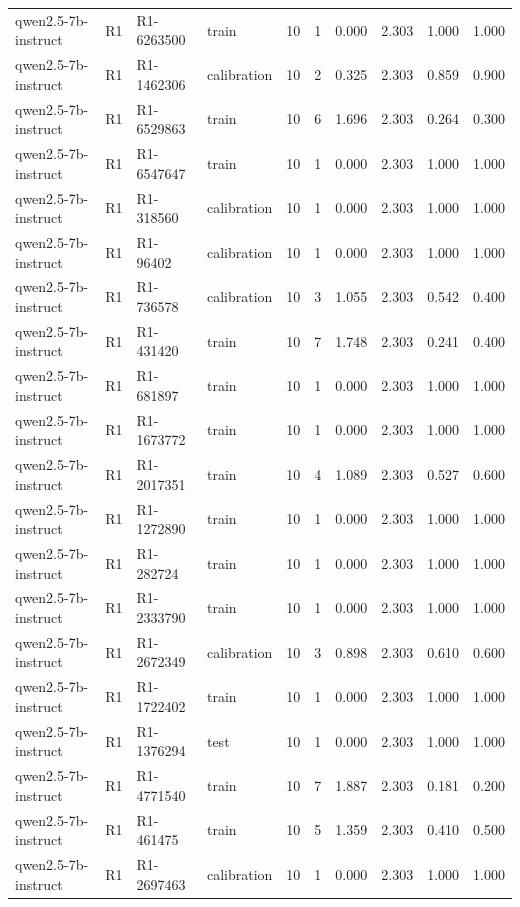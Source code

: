 \begin{table}
\begin{tabular}{llllrrrrrr}
qwen2.5-7b-instruct & R1 & R1-6263500 & train & 10 & 1 & 0.000 & 2.303 & 1.000 & 1.000 \\
qwen2.5-7b-instruct & R1 & R1-1462306 & calibration & 10 & 2 & 0.325 & 2.303 & 0.859 & 0.900 \\
qwen2.5-7b-instruct & R1 & R1-6529863 & train & 10 & 6 & 1.696 & 2.303 & 0.264 & 0.300 \\
qwen2.5-7b-instruct & R1 & R1-6547647 & train & 10 & 1 & 0.000 & 2.303 & 1.000 & 1.000 \\
qwen2.5-7b-instruct & R1 & R1-318560 & calibration & 10 & 1 & 0.000 & 2.303 & 1.000 & 1.000 \\
qwen2.5-7b-instruct & R1 & R1-96402 & calibration & 10 & 1 & 0.000 & 2.303 & 1.000 & 1.000 \\
qwen2.5-7b-instruct & R1 & R1-736578 & calibration & 10 & 3 & 1.055 & 2.303 & 0.542 & 0.400 \\
qwen2.5-7b-instruct & R1 & R1-431420 & train & 10 & 7 & 1.748 & 2.303 & 0.241 & 0.400 \\
qwen2.5-7b-instruct & R1 & R1-681897 & train & 10 & 1 & 0.000 & 2.303 & 1.000 & 1.000 \\
qwen2.5-7b-instruct & R1 & R1-1673772 & train & 10 & 1 & 0.000 & 2.303 & 1.000 & 1.000 \\
qwen2.5-7b-instruct & R1 & R1-2017351 & train & 10 & 4 & 1.089 & 2.303 & 0.527 & 0.600 \\
qwen2.5-7b-instruct & R1 & R1-1272890 & train & 10 & 1 & 0.000 & 2.303 & 1.000 & 1.000 \\
qwen2.5-7b-instruct & R1 & R1-282724 & train & 10 & 1 & 0.000 & 2.303 & 1.000 & 1.000 \\
qwen2.5-7b-instruct & R1 & R1-2333790 & train & 10 & 1 & 0.000 & 2.303 & 1.000 & 1.000 \\
qwen2.5-7b-instruct & R1 & R1-2672349 & calibration & 10 & 3 & 0.898 & 2.303 & 0.610 & 0.600 \\
qwen2.5-7b-instruct & R1 & R1-1722402 & train & 10 & 1 & 0.000 & 2.303 & 1.000 & 1.000 \\
qwen2.5-7b-instruct & R1 & R1-1376294 & test & 10 & 1 & 0.000 & 2.303 & 1.000 & 1.000 \\
qwen2.5-7b-instruct & R1 & R1-4771540 & train & 10 & 7 & 1.887 & 2.303 & 0.181 & 0.200 \\
qwen2.5-7b-instruct & R1 & R1-461475 & train & 10 & 5 & 1.359 & 2.303 & 0.410 & 0.500 \\
qwen2.5-7b-instruct & R1 & R1-2697463 & calibration & 10 & 1 & 0.000 & 2.303 & 1.000 & 1.000 \\

\end{tabular}
\end{table}

